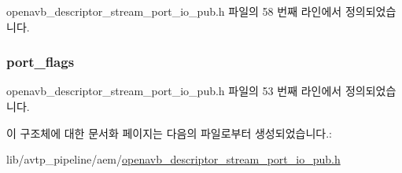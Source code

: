 openavb\+\_\+descriptor\+\_\+stream\+\_\+port\+\_\+io\+\_\+pub.\+h 파일의 58 번째 라인에서 정의되었습니다.

\subsubsection[{\texorpdfstring{port\+\_\+flags}{port_flags}}]{ port\+\_\+flags}\hypertarget{structopenavb__aem__descriptor__stream__port__io__t_a2fd7e2f507df1c9941b168d66a46e145}{}\label{structopenavb__aem__descriptor__stream__port__io__t_a2fd7e2f507df1c9941b168d66a46e145}


openavb\+\_\+descriptor\+\_\+stream\+\_\+port\+\_\+io\+\_\+pub.\+h 파일의 53 번째 라인에서 정의되었습니다.



이 구조체에 대한 문서화 페이지는 다음의 파일로부터 생성되었습니다.\+:\begin{DoxyCompactItemize}
\item 
lib/avtp\+\_\+pipeline/aem/\hyperlink{openavb__descriptor__stream__port__io__pub_8h}{openavb\+\_\+descriptor\+\_\+stream\+\_\+port\+\_\+io\+\_\+pub.\+h}\end{DoxyCompactItemize}
